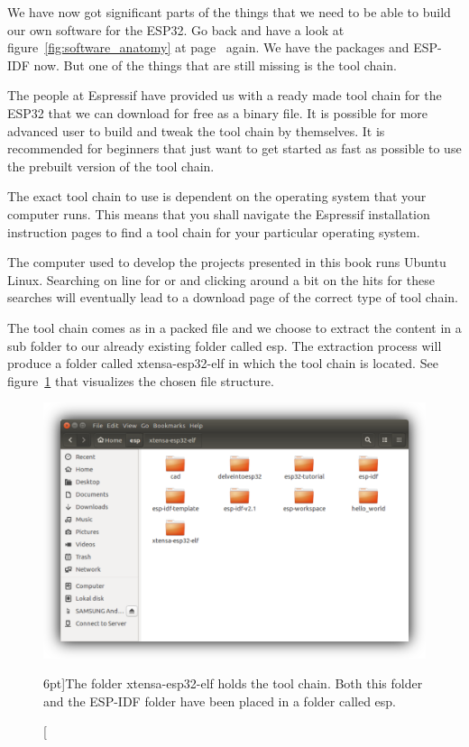 \documentclass{tufte-book}
\begin{document}
We have now got significant parts of the things that we need to be able to build our own software for the ESP32. Go back and have a look at figure~\ref{fig:software_anatomy} at page~\pageref{fig:software_anatomy} again. We have the packages and ESP-IDF now. But one of the things that are still missing is the tool chain.

The people at Espressif have provided us with a ready made tool chain for the ESP32 that we can download for free as a binary file. It is possible for more advanced user to build and tweak the tool chain by themselves. It is recommended for beginners that just want to get started as fast as possible to use the prebuilt version of the tool chain.

The exact tool chain to use is dependent on the operating system that your computer runs. This means that you shall navigate the Espressif installation instruction pages to find a tool chain for your particular operating system.


The computer used to develop the projects presented in this book runs Ubuntu Linux. Searching on line for  or  and clicking around a bit on the hits for these searches will eventually lead to a download page of the correct type of tool chain.

The tool chain comes as in a packed file and we choose to extract the content in a sub folder to our already existing folder called esp. The extraction process will produce a folder called xtensa-esp32-elf in which the tool chain is located. See figure~\ref{fig:tool_chain_folder_shadowed} that visualizes the chosen file structure.

\begin{figure}
	\includegraphics{tool_chain_folder_shadowed.png}
	\caption[ $n$.][6pt]{The folder xtensa-esp32-elf holds the tool chain. Both this folder and the ESP-IDF folder have been placed in a folder called esp.}
	\label{fig:tool_chain_folder_shadowed}
\end{figure}
\end{document}

